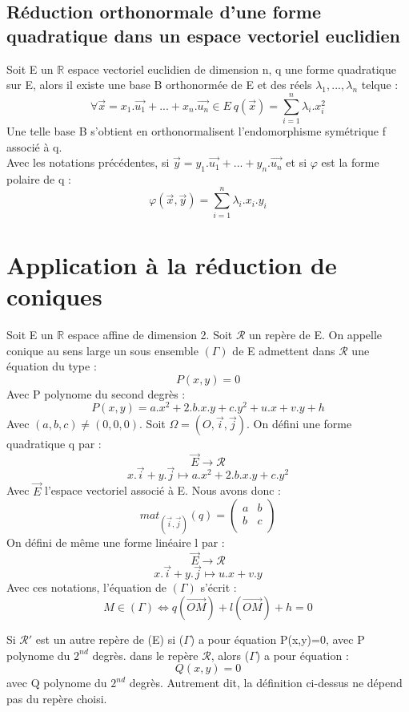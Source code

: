 \subsection{Réduction orthonormale d'une forme quadratique dans un espace vectoriel euclidien}
\begin{theo}
Soit E un $\mathbb{R}$ espace vectoriel euclidien de dimension n, q une forme quadratique sur E, alors il existe une base B orthonormée de E et des réels $\lambda_1,...,\lambda_n$ telque : 
$$\forall \overrightarrow{x} = x_1.\overrightarrow{u_1} + ... + x_n.\overrightarrow{u_n} \in E~ q(\overrightarrow{x}) = \sum_{i=1}^n \lambda_i.x_i^2$$
Une telle base B s'obtient en orthonormalisent l'endomorphisme symétrique f associé à q.\\
Avec les notations précédentes, si $\overrightarrow{y} = y_1.\overrightarrow{u_1} + ... + y_n.\overrightarrow{u_n}$ et si $\varphi$ est la forme polaire de q : 
$$\varphi(\overrightarrow{x},\overrightarrow{y}) = \sum_{i=1}^n \lambda_i.x_i.y_i$$ 
\end{theo}
\section{Application à la réduction de coniques}
\begin{de}
Soit E un $\mathbb{R}$ espace affine de dimension 2. Soit $\mathcal{R}$ un repère de E. On appelle conique au sens large un sous ensemble $(\Gamma)$ de E admettent dans $\mathcal{R}$ une équation du type : 
$$P(x,y) = 0$$
Avec P polynome du second degrès : 
$$P(x,y) = a.x^2 + 2.b.x.y + c.y^2 + u.x + v.y + h$$
Avec $(a,b,c) \neq (0,0,0)$. Soit $\Omega = (O,\overrightarrow{i},\overrightarrow{j})$. On défini une forme quadratique q par : 
$$\overrightarrow{E} \rightarrow \mathcal{R}$$
$$x.\overrightarrow{i} + y.\overrightarrow{j} \mapsto a.x^2 + 2.b.x.y + c.y^2$$
Avec $\overrightarrow{E}$ l'espace vectoriel associé à E. Nous avons donc : 
$$mat_{(\overrightarrow{i},\overrightarrow{j})}(q) = \begin{pmatrix}
                                                      a & b \\
						      b & c \\
                                                     \end{pmatrix}
$$
On défini de même une forme linéaire l par : 
$$\overrightarrow{E} \rightarrow \mathcal{R}$$
$$x.\overrightarrow{i} + y.\overrightarrow{j} \mapsto u.x + v.y$$
Avec ces notations, l'équation de $(\Gamma)$ s'écrit : 
$$M \in (\Gamma) \Leftrightarrow q(\overrightarrow{OM}) + l(\overrightarrow{OM}) + h = 0$$
\end{de}
\begin{prop}
Si $\mathcal{R}'$ est un autre repère de (E) si ($\Gamma$) a pour équation P(x,y)=0, avec P polynome du $2^{nd}$ degrès. dans le repère $\mathcal{R}$, alors ($\Gamma$) a pour équation :
$$Q(x,y) = 0$$
avec Q polynome du $2^{nd}$ degrès. Autrement dit, la définition ci-dessus ne dépend pas du repère choisi.
\end{prop}
